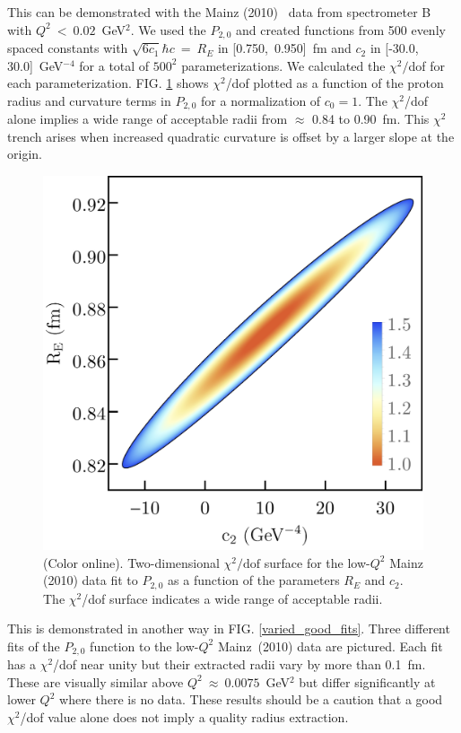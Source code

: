 \documentclass[aps,prd,twocolumn,groupedaddress,10pt]{revtex4-1}
\begin{document}
This can be demonstrated with the Mainz (2010)~\cite{Mainz2010} data from spectrometer B with $Q^2~<~0.02$~GeV$^2$. We used the $P_{2,0}$ and created functions from 500 evenly spaced constants with $\sqrt{6 c_1} \hbar c~=~R_E$ in [0.750,~0.950]~fm and $c_2$ in [-30.0, 30.0]~GeV$^{-4}$ for a total of $500^2$ parameterizations. We calculated the $\chi^2/$dof for each parameterization. FIG. \ref{heat_plot} shows $\chi^2$/dof plotted as a function of the proton radius and curvature terms in $P_{2,0}$ for a normalization of $c_0 = 1$. The $\chi^2$/dof alone implies a wide range of acceptable radii from $\approx$ 0.84 to 0.90~fm. This $\chi^2$ trench arises when increased quadratic curvature is offset by a larger slope at the origin. 
\begin{figure}[h!]
\includegraphics[scale=0.45]{heat_plot_mathematica.pdf}
\caption{(Color online). Two-dimensional $\chi^2/\text{dof}$ surface for the low-$Q^2$ Mainz (2010) data fit to $P_{2,0}$ as a function of the parameters $R_E$ and $c_2$. The $\chi^2$/dof surface indicates a wide range of acceptable radii.}
\label{heat_plot}
\end{figure}

This is demonstrated in another way in FIG. \ref{varied_good_fits}. Three different fits of the $P_{2,0}$ function to the low-$Q^2$ Mainz~(2010) data are pictured. Each fit has a $\chi^2$/dof near unity but their extracted radii vary by more than 0.1~fm. These are visually similar above $Q^2~\approx~0.0075$~GeV$^2$ but differ significantly at lower $Q^2$ where there is no data. These results should be a caution that a good $\chi^2$/dof value alone does not imply a quality radius extraction.  
\end{document}
